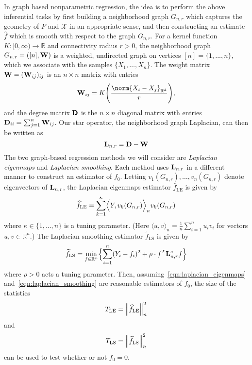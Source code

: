 \documentclass{article}
\newcommand{\Reals}{\mathbb{R}}
\newcommand{\1}{\mathbf{1}}
\newcommand{\Rd}{\Reals^d}
\newcommand{\Lap}{{\bf L}}
\newcommand{\mc}[1]{\mathcal{#1}}
\newcommand{\dotp}[2]{\langle #1, #2 \rangle}
\newcommand{\Dotp}[2]{\Bigl\langle #1, #2 \Bigr\rangle}
\newcommand{\wt}[1]{\widetilde{#1}}
\newcommand{\wh}[1]{\widehat{#1}}
\newcommand{\LE}{\mathrm{LE}}
\newcommand{\LS}{\mathrm{LS}}
\theoremstyle{alden}
\theoremstyle{aldenthm}
\theoremstyle{definition}
\theoremstyle{remark}
\begin{document}
In graph based nonparametric regression, the idea is to perform the above inferential tasks by first building a neighborhood graph $G_{n,r}$ which captures the geometry of $P$ and $\mc{X}$ in an appropriate sense, and then constructing an estimate $\wh{f}$ which is smooth with respect to the graph $G_{n,r}$. For a kernel function $K: [0,\infty) \to \Reals$ and connectivity radius $r > 0$, the neighborhood graph $G_{n,r} = ([n],{\bf W})$ is a weighted, undirected graph on vertices $[n] = \{1,...,n\}$, which we associate with the samples $\{X_1,\ldots,X_n\}$. The weight matrix ${\bf W} = ({\bf W}_{ij})_{ij}$ is an $n \times n$ matrix with entries
\begin{equation*}
\label{eqn:neighborhood_graph}
{\bf W}_{ij} = K\Biggl(\frac{\norm{X_i - X_j}_{\Rd}}{r}\Biggr),
\end{equation*}
and the degree matrix ${\bf D}$ is the $n \times n$ diagonal matrix with entries ${\bf D}_{ii} = \sum_{j = 1}^{n}{\bf W}_{ij}$.  Our star operator, the neighborhood graph Laplacian, can then be written as
\begin{equation}
\label{eqn:graph_Laplacian}
\Lap_{n,r} = \bf{D} - \bf{W}
\end{equation}
The two graph-based regression methods we will consider are \emph{Laplacian eigenmaps} and \emph{Laplacian smoothing}. Each method uses $\Lap_{n,r}$ in a different manner to construct an estimator of $f_0$. Letting $v_1(G_{n,r}),\ldots,v_n(G_{n,r})$ denote eigenvectors of $\Lap_{n,r}$, the Laplacian eigenmaps estimator $\wh{f}_{\LE}$ \citep{belkin2003} is given by 
\begin{equation}
\label{eqn:laplacian_eigenmaps}
\wh{f}_{\textrm{LE}} = \sum_{k = 1}^{\kappa} \Dotp{Y}{v_k(G_{n,r})}_n v_{k}(G_{n,r})
\end{equation}
where $\kappa \in \{1,...,n\}$ is a tuning parameter. (Here $\dotp{u}{v}_n = \frac{1}{n}\sum_{i = 1}^{n} u_i v_i$ for vectors $u,v \in \Reals^n$.) The Laplacian smoothing estimator $\wt{f}_{\LS}$ \citep{smola2003} is given by
\begin{equation}
\label{eqn:laplacian_smoothing}
\wt{f}_{\LS}= \min_{f \in \Reals^n} \Bigl\{\sum_{i = 1}^{n}(Y_i - f_i)^2 + \rho \cdot f^T \Lap_{n,r}^s f \Bigr\}
\end{equation}
where $\rho > 0$ acts a tuning parameter. Then, assuming~\eqref{eqn:laplacian_eigenmaps} and~\eqref{eqn:laplacian_smoothing} are reasonable estimators of $f_0$, the size of the statistics
\begin{equation}
T_{\LE} = \Bigl\|\wh{f}_{\LE}\Bigr\|_n^2 \label{eqn:laplacian_eigenmaps_test}
\end{equation}
and
\begin{equation}
T_{\LS} = \Bigl\|\wt{f}_{\LS}\Bigr\|_n^2 \label{eqn:laplacian_smoothing_test}
\end{equation}
can be used to test whether or not $f_0 = 0$.
\end{document}
